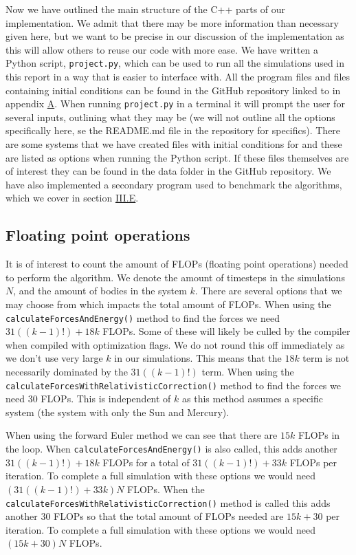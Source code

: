 \documentclass[reprint,english,notitlepage]{revtex4-1}  %
\begin{document}
Now we have outlined the main structure of the C++ parts of our implementation. We admit that there may be more information than necessary given here, but we want to be precise in our discussion of the implementation as this will allow others to reuse our code with more ease. We have written a Python script, \verb+project.py+, which can be used to run all the simulations used in this report in a way that is easier to interface with. All the program files and files containing initial conditions can be found in the GitHub repository linked to in appendix \hyperref[A]{A}. When running \verb+project.py+ in a terminal it will prompt the user for several inputs, outlining what they may be (we will not outline all the options specifically here, se the README.md file in the repository for specifics). There are some systems that we have created files with initial conditions for and these are listed as options when running the Python script. If these files themselves are of interest they can be found in the data folder in the GitHub repository. We have also implemented a secondary program used to benchmark the algorithms, which we cover in section \hyperref[sec:III:e]{III.E}.

\subsection{Floating point operations} \label{sec:III:b}

It is of interest to count the amount of FLOPs (floating point operations) needed to perform the algorithm. We denote the amount of timesteps in the simulations $N$, and the amount of bodies in the system $k$. There are several options that we may choose from which impacts the total amount of FLOPs. When using the \verb+calculateForcesAndEnergy()+ method to find the forces we need $31((k-1)!) + 18k$ FLOPs. Some of these will likely be culled by the compiler when compiled with optimization flags. We do not round this off immediately as we don't use very large $k$ in our simulations. This means that the $18k$ term is not necessarily dominated by the $31((k-1)!)$ term. When using the \verb+calculateForcesWithRelativisticCorrection()+ method to find the forces we need \(30\) FLOPs. This is independent of $k$ as this method assumes a specific system (the system with only the Sun and Mercury).

When using the forward Euler method we can see that there are $15k$ FLOPs in the loop. When \verb+calculateForcesAndEnergy()+ is also called, this adds another $31((k-1)!) + 18k$ FLOPs for a total of $31((k-1)!) + 33k$ FLOPs per iteration. To complete a full simulation with these options we would need $(31((k-1)!) + 33k)N$ FLOPs. When the \verb+calculateForcesWithRelativisticCorrection()+ method is called this adds another $30$ FLOPs so that the total amount of FLOPs needed are $15k + 30$ per iteration. To complete a full simulation with these options we would need $(15k + 30)N$ FLOPs.
\end{document}
